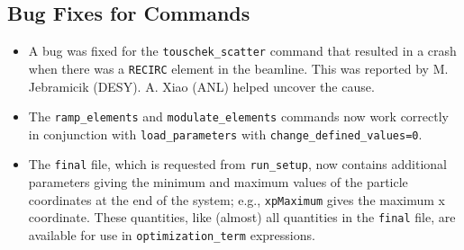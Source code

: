 \documentclass[11pt]{article}
\begin{document}
\subsection{Bug Fixes for Commands}
\begin{itemize}
\item A bug was fixed for the \verb|touschek_scatter| command that resulted in a crash when there was a
  \verb|RECIRC| element in the beamline. This was reported by M. Jebramicik (DESY). A. Xiao (ANL) helped
  uncover the cause.
\item The \verb|ramp_elements| and \verb|modulate_elements| commands now work correctly in conjunction
  with \verb|load_parameters| with \verb|change_defined_values=0|.
\item The \verb|final| file, which is requested from \verb|run_setup|, now contains additional parameters giving
  the minimum and maximum values of the particle coordinates at the end of the system; e.g., \verb|xpMaximum| gives
  the maximum x coordinate. These quantities, like (almost) all quantities in the \verb|final| file, are available
  for use in \verb|optimization_term| expressions.
\end{itemize}
\end{document}
